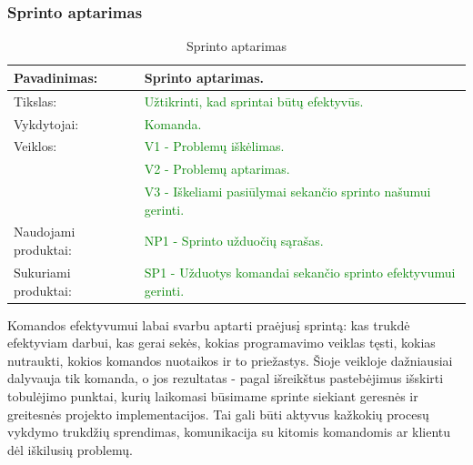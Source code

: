 \documentclass{VUMIFPSkursinis}
\begin{document}
	\subsubsection{Sprinto aptarimas}
	\begin{center}
		\begin{table}[ht]
			\caption{Sprinto aptarimas}
			\begin{tabular}{ | l | l | }
				\hline
				Pavadinimas:		& Sprinto aptarimas.							\\ \hline
				Tikslas:		& \textcolor{green}{Užtikrinti, kad sprintai būtų efektyvūs.}				\\ \hline
				Vykdytojai:		&\textcolor{green}{ Komanda.}								\\ \hline
				Veiklos:		&\textcolor{green}{ V1 - Problemų iškėlimas.}						\\
							& \textcolor{green}{V2 - Problemų aptarimas.}						\\
							& \textcolor{green}{V3 - Iškeliami pasiūlymai sekančio sprinto našumui gerinti.}		\\ \hline

				Naudojami produktai:	& \textcolor{green}{NP1 - Sprinto užduočių sąrašas. 	}				\\ \hline
				Sukuriami produktai:	& \textcolor{green}{SP1 - Užduotys komandai sekančio sprinto efektyvumui gerinti.}	\\ \hline
			\end{tabular}
		\end{table}
	\end{center}
	Komandos efektyvumui labai svarbu aptarti praėjusį sprintą: kas trukdė efektyviam darbui, kas gerai sekės, kokias programavimo veiklas tęsti, kokias nutraukti, kokios komandos nuotaikos ir to priežastys.
	Šioje veikloje dažniausiai dalyvauja tik komanda, o jos rezultatas - pagal išreikštus pastebėjimus išskirti tobulėjimo punktai, kurių laikomasi būsimame sprinte siekiant geresnės ir greitesnės projekto implementacijos.
	Tai gali būti aktyvus kažkokių procesų vykdymo trukdžių sprendimas, komunikacija su kitomis komandomis ar klientu dėl iškilusių problemų.

	\newpage
\end{document}
